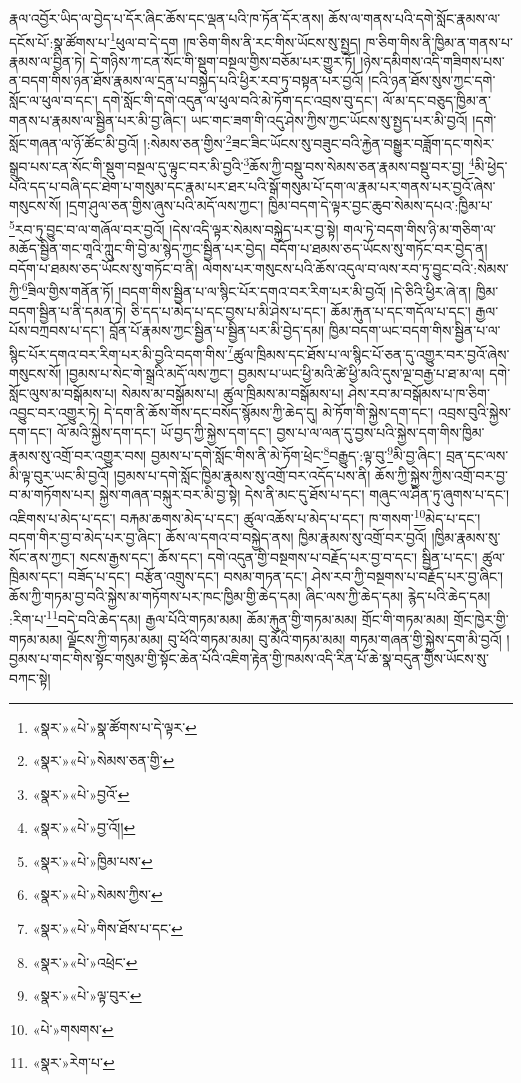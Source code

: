 རྣལ་འབྱོར་ཡིད་ལ་བྱེད་པ་དོར་ཞིང་ཆོས་དང་ལྡན་པའི་ཁ་ཏོན་དོར་ནས། ཆོས་ལ་གནས་པའི་དགེ་སློང་རྣམས་ལ་དངོས་པོ་:སྣ་ཚོགས་པ་\footnote{«སྣར་»«པེ་»སྣ་ཚོགས་པ་དེ་ལྟར་}ཕུལ་བ་དེ་དག །ཁ་ཅིག་གིས་ནི་རང་གིས་ཡོངས་སུ་སྤྱད། ཁ་ཅིག་གིས་ནི་ཁྱིམ་ན་གནས་པ་རྣམས་ལ་བྱིན་ཏེ། དེ་གཉིས་ཀ་ངན་སོང་གི་སྡུག་བསྔལ་གྱིས་བཅོམ་པར་གྱུར་ཏོ། །ཉེས་དམིགས་འདི་གཟིགས་པས་ན་བདག་གིས་ཉན་ཐོས་རྣམས་ལ་དྲན་པ་བསྐྱེད་པའི་ཕྱིར་རབ་ཏུ་བསྟན་པར་བྱའོ། །ངའི་ཉན་ཐོས་སུས་ཀྱང་དགེ་སློང་ལ་ཕུལ་བ་དང་། དགེ་སློང་གི་དགེ་འདུན་ལ་ཕུལ་བའི་མེ་ཏོག་དང་འབྲས་བུ་དང་། ལོ་མ་དང་བཅུད་ཁྱིམ་ན་གནས་པ་རྣམས་ལ་སྦྱིན་པར་མི་བྱ་ཞིང་། ཡང་གང་ཟག་གི་འདུ་ཤེས་ཀྱིས་ཀྱང་ཡོངས་སུ་སྤྱད་པར་མི་བྱའོ། །དགེ་སློང་གཞན་ལ་ཉོ་ཚོང་མི་བྱའོ། །:སེམས་ཅན་གྱིས་\footnote{«སྣར་»«པེ་»སེམས་ཅན་གྱི་}ཟང་ཟིང་ཡོངས་སུ་བཟུང་བའི་རྐྱེན་བསྒྱུར་བཟློག་དང་གསེར་སྒྲུབ་པས་ངན་སོང་གི་སྡུག་བསྔལ་དུ་ལྟུང་བར་མི་བྱའི་\footnote{«སྣར་»«པེ་»བྱའོ་}ཆོས་ཀྱི་བསྡུ་བས་སེམས་ཅན་རྣམས་བསྡུ་བར་བྱ། \footnote{«སྣར་»«པེ་»བྱ་འོ།། }མི་ཕྱེད་པའི་དད་པ་བཞི་དང་ཐེག་པ་གསུམ་དང་རྣམ་པར་ཐར་པའི་སྒོ་གསུམ་པོ་དག་ལ་རྣམ་པར་གནས་པར་བྱའོ་ཞེས་གསུངས་སོ། །དྲག་ཤུལ་ཅན་གྱིས་ཞུས་པའི་མདོ་ལས་ཀྱང་། ཁྱིམ་བདག་དེ་ལྟར་བྱང་ཆུབ་སེམས་དཔའ་:ཁྱིམ་པ་\footnote{«སྣར་»«པེ་»ཁྱིམ་པས་}རབ་ཏུ་བྱུང་བ་ལ་གཞོལ་བར་བྱའོ། །དེས་འདི་ལྟར་སེམས་བསྐྱེད་པར་བྱ་སྟེ། གལ་ཏེ་བདག་གིས་ཉི་མ་གཅིག་ལ་མཆོད་སྦྱིན་གང་གཱའི་ཀླུང་གི་བྱེ་མ་སྙེད་ཀྱང་སྦྱིན་པར་བྱེད། བདོག་པ་ཐམས་ཅད་ཡོངས་སུ་གཏོང་བར་བྱེད་ན། བདོག་པ་ཐམས་ཅད་ཡོངས་སུ་གཏོང་བ་ནི། ལེགས་པར་གསུངས་པའི་ཆོས་འདུལ་བ་ལས་རབ་ཏུ་བྱུང་བའི་:སེམས་ཀྱི་\footnote{«སྣར་»«པེ་»སེམས་ཀྱིས་}ཟིལ་གྱིས་གནོན་ཏོ། །བདག་གིས་སྦྱིན་པ་ལ་སྙིང་པོར་དགའ་བར་རིག་པར་མི་བྱའོ། །དེ་ཅིའི་ཕྱིར་ཞེ་ན། ཁྱིམ་བདག་སྦྱིན་པ་ནི་དམན་ཏེ། ཅི་དད་པ་མེད་པ་དང་བྱས་པ་མི་ཤེས་པ་དང་། ཆོམ་རྐུན་པ་དང་གདོལ་པ་དང་། རྒྱལ་པོས་བཀྲབས་པ་དང་། བློན་པོ་རྣམས་ཀྱང་སྦྱིན་པ་སྦྱིན་པར་མི་བྱེད་དམ། ཁྱིམ་བདག་ཡང་བདག་གིས་སྦྱིན་པ་ལ་སྙིང་པོར་དགའ་བར་རིག་པར་མི་བྱའི་བདག་གིས་\footnote{«སྣར་»«པེ་»གིས་ཐོས་པ་དང་}ཚུལ་ཁྲིམས་དང་ཐོས་པ་ལ་སྙིང་པོ་ཅན་དུ་འགྱུར་བར་བྱའོ་ཞེས་གསུངས་སོ། །བྱམས་པ་སེང་གེ་སྒྲའི་མདོ་ལས་ཀྱང་། བྱམས་པ་ཡང་ཕྱི་མའི་ཚེ་ཕྱི་མའི་དུས་ལྔ་བརྒྱ་པ་ཐ་མ་ལ། དགེ་སློང་ལུས་མ་བསྒོམས་པ། སེམས་མ་བསྒོམས་པ། ཚུལ་ཁྲིམས་མ་བསྒོམས་པ། ཤེས་རབ་མ་བསྒོམས་པ་ཁ་ཅིག་འབྱུང་བར་འགྱུར་ཏེ། དེ་དག་ནི་ཆོས་གོས་དང་བསོད་སྙོམས་ཀྱི་ཆེད་དུ། མེ་ཏོག་གི་སྐྱེས་དག་དང་། འབྲས་བུའི་སྐྱེས་དག་དང་། ལོ་མའི་སྐྱེས་དག་དང་། ཡོ་བྱད་ཀྱི་སྐྱེས་དག་དང་། བྱས་པ་ལ་ལན་དུ་བྱས་པའི་སྐྱེས་དག་གིས་ཁྱིམ་རྣམས་སུ་འགྲོ་བར་འགྱུར་བས། བྱམས་པ་དགེ་སློང་གིས་ནི་མེ་ཏོག་ཕྲེང་\footnote{«སྣར་»«པེ་»འཕྲེང་}བརྒྱུད་:ལྟ་བུ་\footnote{«སྣར་»«པེ་»ལྟ་བུར་}མི་བྱ་ཞིང་། བྲན་དང་ལས་མི་ལྟ་བུར་ཡང་མི་བྱའོ། །བྱམས་པ་དགེ་སློང་ཁྱིམ་རྣམས་སུ་འགྲོ་བར་འདོད་པས་ནི། ཆོས་ཀྱི་སྐྱེས་ཀྱིས་འགྲོ་བར་བྱ་བ་མ་གཏོགས་པར། སྐྱེས་གཞན་བསྐུར་བར་མི་བྱ་སྟེ། དེས་ནི་མང་དུ་ཐོས་པ་དང་། གཞུང་ལ་ཤིན་ཏུ་ཞུགས་པ་དང་། འཇིགས་པ་མེད་པ་དང་། བརྐམ་ཆགས་མེད་པ་དང་། ཚུལ་འཆོས་པ་མེད་པ་དང་། ཁ་གསག་\footnote{«པེ་»གསགས་}མེད་པ་དང་། བདག་གིར་བྱ་བ་མེད་པར་བྱ་ཞིང་། ཆོས་ལ་དགའ་བ་བསྐྱེད་ནས། ཁྱིམ་རྣམས་སུ་འགྲོ་བར་བྱའོ། །ཁྱིམ་རྣམས་སུ་སོང་ནས་ཀྱང་། སངས་རྒྱས་དང་། ཆོས་དང་། དགེ་འདུན་གྱི་བསྔགས་པ་བརྗོད་པར་བྱ་བ་དང་། སྦྱིན་པ་དང་། ཚུལ་ཁྲིམས་དང་། བཟོད་པ་དང་། བརྩོན་འགྲུས་དང་། བསམ་གཏན་དང་། ཤེས་རབ་ཀྱི་བསྔགས་པ་བརྗོད་པར་བྱ་ཞིང་། ཆོས་ཀྱི་གཏམ་བྱ་བའི་སྐྱེས་མ་གཏོགས་པར་ཁང་ཁྱིམ་གྱི་ཆེད་དམ། ཞིང་ལས་ཀྱི་ཆེད་དམ། རྙེད་པའི་ཆེད་དམ། :རིག་པ་\footnote{«སྣར་»རེག་པ་}བདེ་བའི་ཆེད་དམ། རྒྱལ་པོའི་གཏམ་མམ། ཆོམ་རྐུན་གྱི་གཏམ་མམ། གྲོང་གི་གཏམ་མམ། གྲོང་ཁྱེར་གྱི་གཏམ་མམ། ལྗོངས་ཀྱི་གཏམ་མམ། བུ་ཕོའི་གཏམ་མམ། བུ་མོའི་གཏམ་མམ། གཏམ་གཞན་གྱི་སྐྱེས་དག་མི་བྱའོ། །བྱམས་པ་གང་གིས་སྟོང་གསུམ་གྱི་སྟོང་ཆེན་པོའི་འཇིག་རྟེན་གྱི་ཁམས་འདི་རིན་པོ་ཆེ་སྣ་བདུན་གྱིས་ཡོངས་སུ་བཀང་སྟེ། 
